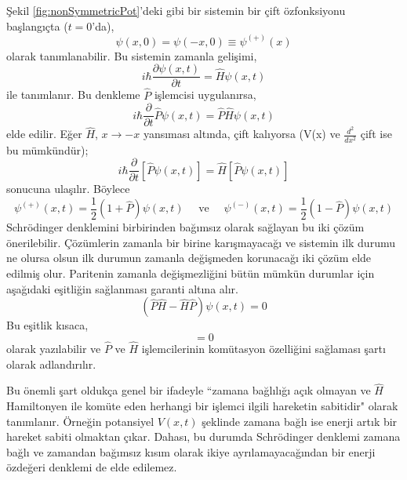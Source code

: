 \documentclass[a4paper,12pt, twoside]{article}
\begin{document}
Şekil \ref{fig:nonSymmetricPot}'deki gibi bir sistemin bir çift özfonksiyonu başlangıçta ($t=0$'da),
\begin{equation}
\psi(x, 0)=\psi(-x, 0) \equiv \psi^{(+)}(x)
\end{equation}
olarak tanımlanabilir. Bu sistemin zamanla gelişimi,
\begin{equation}
i \hbar \frac{\partial \psi(x, t)}{\partial t}= \hat H \psi(x, t)
\end{equation}
ile tanımlanır. Bu denkleme $\hat P$ işlemcisi uygulanırsa,
\begin{equation}
i \hbar \frac{\partial}{\partial t} \hat P \psi(x, t)= \hat P  \hat H \psi(x, t)
\end{equation}
elde edilir. Eğer $\hat H$, $x \rightarrow -x$ yansıması altında, çift kalıyorsa (V(x) ve $\frac{d^2}{dx^2}$ çift ise bu mümkündür);
\begin{equation}
i \hbar \frac{\partial}{\partial t}[ \hat P \psi(x, t)]= \hat H[ \hat P \psi(x, t)]
\end{equation}
sonucuna ulaşılır. Böylece
\begin{equation}
\psi^{(+)}(x, t)=\frac{1}{2}(1+ \hat P) \psi(x, t) \quad \text{ ve } \quad \psi^{(-)}(x, t)=\frac{1}{2}(1- \hat P) \psi(x, t) 
\end{equation}
Schrödinger denklemini birbirinden bağımsız olarak sağlayan bu iki çözüm önerilebilir. Çözümlerin zamanla bir birine karışmayacağı ve sistemin ilk durumu ne olursa olsun ilk durumun zamanla değişmeden korunacağı iki çözüm elde edilmiş olur.
Paritenin zamanla değişmezliğini bütün mümkün durumlar için aşağıdaki eşitliğin sağlanması garanti altına alır. 
\begin{equation}
( \hat P  \hat H-  \hat H  \hat P) \psi(x, t)=0
\end{equation}
Bu eşitlik kısaca,
\begin{equation}
[ \hat P,  \hat H]=0
\end{equation}
olarak yazılabilir ve $\hat P$ ve $\hat H$ işlemcilerinin komütasyon özelliğini sağlaması şartı olarak adlandırılır.

Bu önemli şart oldukça genel bir ifadeyle ``zamana bağlılığı açık olmayan ve $\hat H$ Hamiltonyen ile komüte eden herhangi bir işlemci ilgili hareketin sabitidir" olarak tanımlanır. Örneğin potansiyel $V(x,t)$ şeklinde zamana bağlı ise enerji artık bir hareket sabiti olmaktan çıkar. Dahası, bu durumda Schrödinger denklemi zamana bağlı ve zamandan bağımsız kısım olarak ikiye ayrılamayacağından bir enerji özdeğeri denklemi de elde edilemez.
\end{document}
